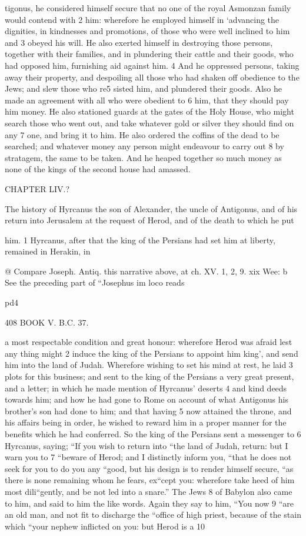 tigonus, he considered himself secure that no one of the royal Asmonzan family would contend with 2 him: wherefore he employed himself in ‘advancing the dignities, in kindnesses and promotions, of those who were well inclined to him and 3 obeyed his will. He also exerted himself in destroying those persons, together with their families, and in plundering their cattle and their goods, who had opposed him, furnishing aid against him. 4 And he oppressed persons, taking away their property, and despoiling all those who had shaken off obedience to the Jews; and slew those who re5 sisted him, and plundered their goods. Also he made an agreement with all who were obedient to 6 him, that they should pay him money. He also stationed guards at the gates of the Holy House, who might search those who went out, and take whatever gold or silver they should find on any 7 one, and bring it to him. He also ordered the coffins of the dead to be searched; and whatever money any person might endeavour to carry out 8 by stratagem, the same to be taken. And he heaped together so much money as none of the kings of the second house had amassed. 

CHAPTER LIV.? 

The history of Hyrcanus the son of Alexander, the uncle of Antigonus, and of his return into Jerusalem at the request of Herod, and of the death to which he put 

him. 1 Hyrcanus, after that the king of the Persians had set him at liberty, remained in Herakin, in 

@ Compare Joseph. Antiq. this narrative above, at ch. XV. 1, 2, 9. xix Wee: b See the preceding part of “Josephus im loco reads 

pd4 

408 BOOK V. B.C. 37. 

a most respectable condition and great honour: wherefore Herod was afraid lest any thing might 2 induce the king of the Persians to appoint him king’, and send him into the land of Judah. Wherefore wishing to set his mind at rest, he laid 3 plots for this business; and sent to the king of the Persians a very great present, and a letter; in which he made mention of Hyrcanus’ deserts 4 and kind deeds towards him; and how he had gone to Rome on account of what Antigonus his brother’s son had done to him; and that having 5 now attained the throne, and his affairs being in order, he wished to reward him in a proper manner for the benefits which he had conferred. 
So the king of the Persians sent a messenger to 6 Hyrcanus, saying; “If you wish to return into “the land of Judah, return: but I warn you to 7 “beware of Herod; and I distinctly inform you, “that he does not seek for you to do you any “good, but his design is to render himself secure, “as there is none remaining whom he fears, ex“cept you: wherefore take heed of him most dili“gently, and be not led into a snare.” The Jews 8 of Babylon also came to him, and said to him the like words. Again they say to him, “You now 9 “are an old man, and not fit to discharge the “office of high priest, because of the stain which “your nephew inflicted on you: but Herod is a 10 

